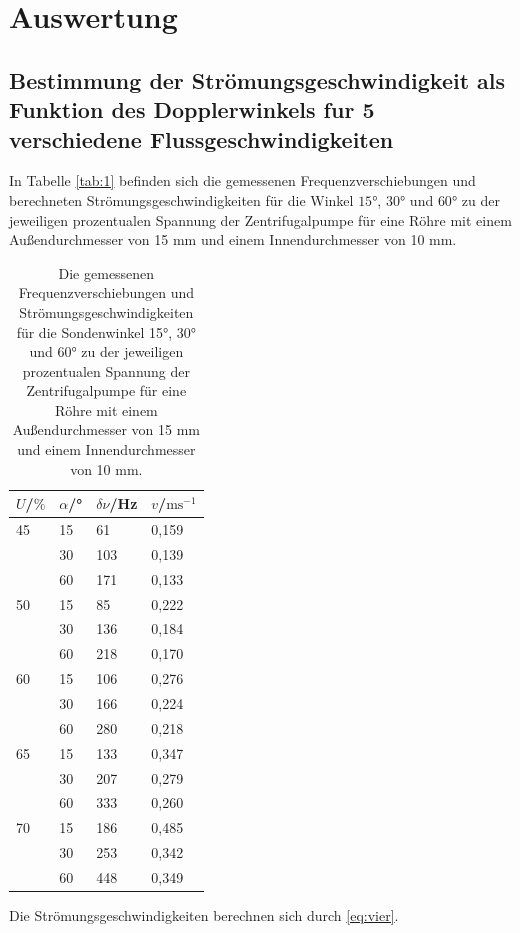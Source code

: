 \section{Auswertung}
\label{sec:Auswertung}

\subsection{Bestimmung der Strömungsgeschwindigkeit als Funktion des Dopplerwinkels fur 5 verschiedene Flussgeschwindigkeiten}
In Tabelle \autoref{tab:1} befinden sich die gemessenen Frequenzverschiebungen und berechneten Strömungsgeschwindigkeiten für die Winkel $15$°, $30$° und $60$° zu der jeweiligen prozentualen Spannung der Zentrifugalpumpe für eine Röhre mit einem Außendurchmesser von 15 mm und einem Innendurchmesser von 10 mm.
\begin{table}[H]
  \centering
  \caption{Die gemessenen Frequenzverschiebungen und Strömungsgeschwindigkeiten für die Sondenwinkel 15°, 30° und 60° zu der jeweiligen prozentualen Spannung der Zentrifugalpumpe für eine Röhre mit einem Außendurchmesser von 15 mm und einem Innendurchmesser von 10 mm.}
  \begin{tabular}{l|l|l|l}
  $U$/$\%$ & $\alpha$/° & $\delta\nu$/Hz & $v$/$\textrm{ms}^{-1}$\\ \hline
  45 & 15 & 61 &  0,159\\
     & 30 & 103 & 0,139\\
     & 60 & 171 & 0,133\\ \hline
  50 & 15 & 85 &  0,222\\
     & 30 & 136 & 0,184\\
     & 60 & 218 & 0,170\\ \hline
  60 & 15 & 106 & 0,276\\
     & 30 & 166 & 0,224\\
     & 60 & 280 & 0,218\\ \hline
  65 & 15 & 133 & 0,347\\
     & 30 & 207 & 0,279\\
     & 60 & 333 & 0,260\\ \hline
  70 & 15 & 186 & 0,485\\
     & 30 & 253 & 0,342\\
     & 60 & 448 & 0,349\\ \hline
  \end{tabular}
  \label{tab:1}
\end{table}
Die Strömungsgeschwindigkeiten berechnen sich durch \autoref{eq:vier}. \\
